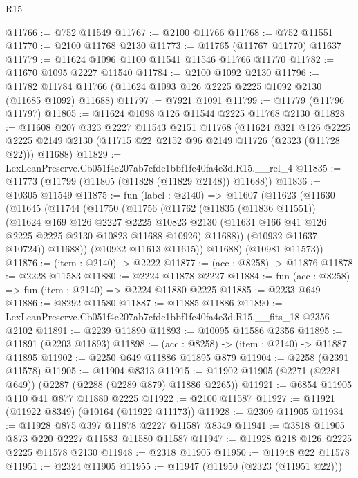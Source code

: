 \begin{lexlean}{R15}
\begin{coremodule}
@11766 := @752 @11549
@11767 := @2100 @11766
@11768 := @752 @11551
@11770 := @2100 @11768 @2130
@11773 := @11765 (@11767 @11770) @11637
@11779 := @11624 @1096 @1100 @11541 @11546 @11766 @11770
@11782 := @11670 @1095 @2227 @11540
@11784 := @2100 @1092 @2130
@11796 := @11782 @11784 @11766 (@11624 @1093 @126 @2225 @2225 @1092 @2130 (@11685 @1092) @11688)
@11797 := @7921 @1091
@11799 := @11779 (@11796 @11797)
@11805 := @11624 @1098 @126 @11544 @2225 @11768 @2130
@11828 := @11608
    @207
    @323
    @2227
    @11543
    @2151
    @11768
    (@11624
      @321
      @126
      @2225
      @2225
      @2149
      @2130
      (@11715 @22 @2152 @96 @2149 @11726 (@2323 (@11728 @22)))
      @11688)
@11829 := LexLeanPreserve.Cb051f4e207ab7cfde1bbf1fe40fa4e3d.R15.__rel_4
@11835 := @11773 (@11799 (@11805 (@11828 (@11829 @2148)) @11688))
@11836 := @10305 @11549
@11875 := fun (label : @2140) =>
  @11607
    (@11623
      (@11630
        (@11645
          (@11744
            (@11750
              (@11756
                (@11762
                  (@11835 (@11836 @11551))
                  (@11624
                    @169
                    @126
                    @2227
                    @2225
                    @10823
                    @2130
                    (@11631 @166 @41 @126 @2225 @2225 @2130 @10823 @11688 @10926)
                    @11688))
                (@10932 @11637 @10724))
              @11688))
          (@10932 @11613 @11615))
        @11688)
      (@10981 @11573))
@11876 := (item : @2140) -> @2222
@11877 := (acc : @8258) -> @11876
@11878 := @2228 @11583
@11880 := @2224 @11878 @2227
@11884 := fun (acc : @8258) => fun (item : @2140) => @2224 @11880 @2225
@11885 := @2233 @649
@11886 := @8292 @11580
@11887 := @11885 @11886
@11890 := LexLeanPreserve.Cb051f4e207ab7cfde1bbf1fe40fa4e3d.R15.__fits_18 @2356 @2102
@11891 := @2239 @11890
@11893 := @10095 @11586 @2356
@11895 := @11891 (@2203 @11893)
@11898 := (acc : @8258) -> (item : @2140) -> @11887 @11895
@11902 := @2250 @649 @11886 @11895 @879
@11904 := @2258 (@2391 @11578)
@11905 := @11904 @8313
@11915 := @11902 @11905 (@2271 (@2281 @649)) (@2287 (@2288 (@2289 @879) @11886 @2265))
@11921 := @6854 @11905 @110 @41 @877 @11880 @2225
@11922 := @2100 @11587
@11927 := @11921 (@11922 @8349) (@10164 (@11922 @11173))
@11928 := @2309 @11905
@11934 := @11928 @875 @397 @11878 @2227 @11587 @8349
@11941 := @3818 @11905 @873 @220 @2227 @11583 @11580 @11587
@11947 := @11928 @218 @126 @2225 @2225 @11578 @2130
@11948 := @2318 @11905
@11950 := @11948 @22 @11578
@11951 := @2324 @11905
@11955 := @11947 (@11950 (@2323 (@11951 @22)))

\end{coremodule}
\end{lexlean}
